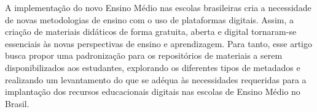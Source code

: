 \documentclass[12pt]{article}
\begin{document}
\begin{resumo} 
    A implementação do novo Ensino Médio nas escolas brasileiras cria a necessidade de novas metodologias de ensino com o uso de plataformas digitais. Assim, a criação de materiais didáticos de forma gratuita, aberta e digital tornaram-se essenciais às novas perspectivas de ensino e aprendizagem. Para tanto, esse artigo busca propor uma padronização para os repositórios de materiais a serem disponibilizados aos estudantes, explorando os diferentes tipos de metadados e realizando um levantamento do que se adéqua às necessidades requeridas para a implantação dos recursos educacionais digitais nas escolas de Ensino Médio no Brasil.
\end{resumo}
\begin{comment}
\section{General Information}

All full papers and posters (short papers) submitted to some SBC conference,
including any supporting documents, should be written in English or in
Portuguese. The format paper should be A4 with single column, 3.5 cm for upper
margin, 2.5 cm for bottom margin and 3.0 cm for lateral margins, without
headers or footers. The main font must be Times, 12 point nominal size, with 6
points of space before each paragraph. Page numbers must be suppressed.

Full papers must respect the page limits defined by the conference.
Conferences that publish just abstracts ask for \textbf{one}-page texts.

\section{First Page} \label{sec:firstpage}

The first page must display the paper title, the name and address of the
authors, the abstract in English and ``resumo'' in Portuguese (``resumos'' are
required only for papers written in Portuguese). The title must be centered
over the whole page, in 16 point boldface font and with 12 points of space
before itself. Author names must be centered in 12 point font, bold, all of
them disposed in the same line, separated by commas and with 12 points of
space after the title. Addresses must be centered in 12 point font, also with
12 points of space after the authors' names. E-mail addresses should be
written using font Courier New, 10 point nominal size, with 6 points of space
before and 6 points of space after.


\end{comment}
\end{document}
